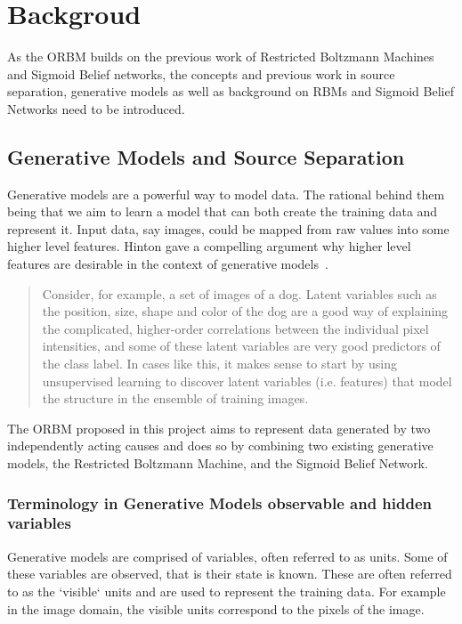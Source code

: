 \chapter{Backgroud}

 As the ORBM builds on the previous work of Restricted Boltzmann Machines and Sigmoid Belief networks, the concepts and previous work in source separation, generative models as well as background on RBMs and Sigmoid Belief Networks need to be introduced.


\section{Generative Models and Source Separation}

Generative models are a powerful way to model data. The rational behind them being that we aim to learn a model that can both create the training data and represent it. Input data, say images, could be mapped from raw values into some higher level features. Hinton gave a compelling argument why higher level features are desirable in the context of generative models~\cite{hinton:32723:vv}. \begin{quote} Consider, for example, a set of images of a dog. Latent variables such as the position, size, shape and color of the dog are a good way of explaining the complicated, higher-order correlations between the individual pixel intensities, and some of these latent variables are very good predictors of the class label. In cases like this, it makes sense to start by using unsupervised learning to discover latent variables (i.e. features) that model the structure in the ensemble of training images.\end{quote}

The ORBM proposed in this project aims to represent data generated by two independently acting causes and does so by combining two existing generative models, the Restricted Boltzmann Machine, and the Sigmoid Belief Network.

\subsection{Terminology in Generative Models observable and hidden variables}

Generative models are comprised of variables, often referred to as units. Some of these variables are observed, that is their state is known. These are often referred to as the `visible` units and are used to represent the training data. For example in the image domain, the visible units correspond to the pixels of the image.

